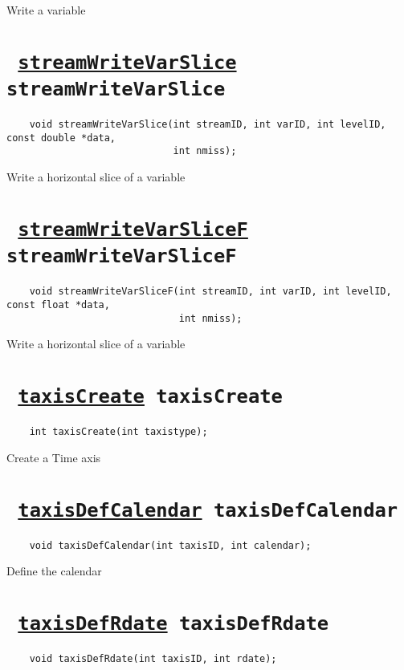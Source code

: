 Write a variable
\ifpdfoutput{}{(\ref{streamWriteVarF})}


\section*{\tt 
\ifpdf
\hyperref[streamWriteVarSlice]{streamWriteVarSlice}
\else
streamWriteVarSlice
\fi
}
\begin{verbatim}
    void streamWriteVarSlice(int streamID, int varID, int levelID, const double *data, 
                             int nmiss);
\end{verbatim}

Write a horizontal slice of a variable
\ifpdfoutput{}{(\ref{streamWriteVarSlice})}


\section*{\tt 
\ifpdf
\hyperref[streamWriteVarSliceF]{streamWriteVarSliceF}
\else
streamWriteVarSliceF
\fi
}
\begin{verbatim}
    void streamWriteVarSliceF(int streamID, int varID, int levelID, const float *data, 
                              int nmiss);
\end{verbatim}

Write a horizontal slice of a variable
\ifpdfoutput{}{(\ref{streamWriteVarSliceF})}


\section*{\tt 
\ifpdf
\hyperref[taxisCreate]{taxisCreate}
\else
taxisCreate
\fi
}
\begin{verbatim}
    int taxisCreate(int taxistype);
\end{verbatim}

Create a Time axis
\ifpdfoutput{}{(\ref{taxisCreate})}


\section*{\tt 
\ifpdf
\hyperref[taxisDefCalendar]{taxisDefCalendar}
\else
taxisDefCalendar
\fi
}
\begin{verbatim}
    void taxisDefCalendar(int taxisID, int calendar);
\end{verbatim}

Define the calendar
\ifpdfoutput{}{(\ref{taxisDefCalendar})}


\section*{\tt 
\ifpdf
\hyperref[taxisDefRdate]{taxisDefRdate}
\else
taxisDefRdate
\fi
}
\begin{verbatim}
    void taxisDefRdate(int taxisID, int rdate);
\end{verbatim}

